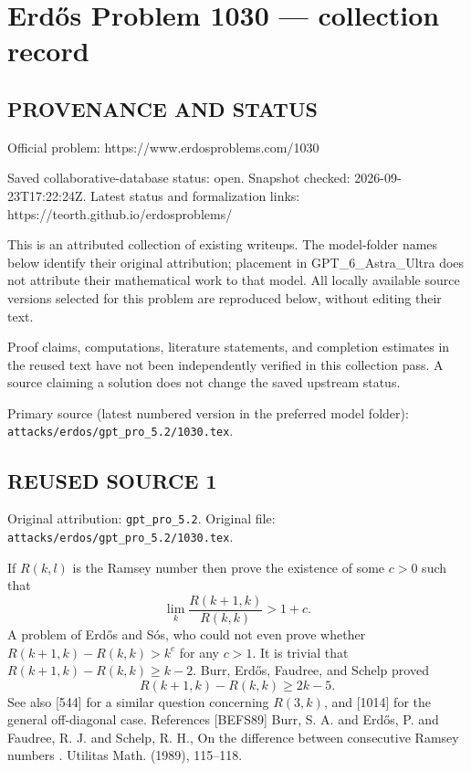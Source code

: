 \section*{Erd\H{o}s Problem 1030 --- collection record}

\subsection*{PROVENANCE AND STATUS}
Official problem: https://www.erdosproblems.com/1030

Saved collaborative-database status: open.
Snapshot checked: 2026-09-23T17:22:24Z.
Latest status and formalization links: https://teorth.github.io/erdosproblems/

This is an attributed collection of existing writeups. The model-folder names below identify their original attribution; placement in GPT\_6\_Astra\_Ultra does not attribute their mathematical work to that model. All locally available source versions selected for this problem are reproduced below, without editing their text.

Proof claims, computations, literature statements, and completion estimates in the reused text have not been independently verified in this collection pass. A source claiming a solution does not change the saved upstream status.

Primary source (latest numbered version in the preferred model folder): \texttt{attacks/erdos/gpt\_pro\_5.2/1030.tex}.

\subsection*{REUSED SOURCE 1}
Original attribution: \texttt{gpt\_pro\_5.2}.
Original file: \texttt{attacks/erdos/gpt\_pro\_5.2/1030.tex}.


If $R(k,l)$ is the Ramsey number then prove the existence of some $c>0$ such that\[\lim_k \frac{R(k+1,k)}{R(k,k)}> 1+c.\] A problem of Erd\H{o}s and S\'{o}s, who could not even prove whether $R(k+1,k)-R(k,k)>k^c$ for any $c>1$. It is trivial that $R(k+1,k)-R(k,k)\geq k-2$. Burr, Erd\H{o}s, Faudree, and Schelp \cite{BEFS89} proved\[R(k+1,k)-R(k,k)\geq 2k-5.\]See also [544] for a similar question concerning $R(3,k)$, and [1014] for the general off-diagonal case. References [BEFS89] Burr, S. A. and Erd\H{o}s, P. and Faudree, R. J. and Schelp, R. H., On the difference between consecutive {R}amsey numbers . Utilitas Math. (1989), 115--118.

